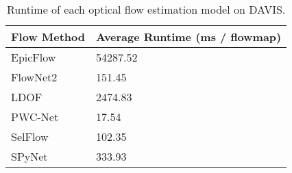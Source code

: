 \documentclass[10pt,letterpaper]{article}
\begin{document}
\begin{table*}
\footnotesize
\begin{center}
\begin{tabular}{l|l}
Flow Method & Average Runtime (ms / flowmap) \\ \hline
EpicFlow    & 54287.52                       \\
FlowNet2    & 151.45                         \\
LDOF        & 2474.83                        \\
PWC-Net     & 17.54                          \\
SelFlow     & 102.35                         \\
SPyNet      & 333.93                        
\end{tabular}
\caption{Runtime of each optical flow estimation model on DAVIS.}
\vspace{-0.7cm}
\end{center}
\end{table*}
\end{document}
